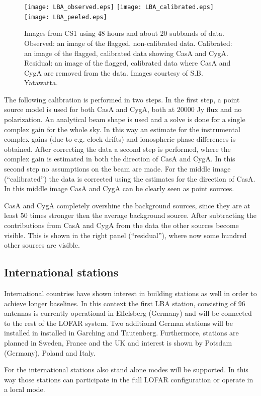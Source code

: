 \documentclass[journal]{IEEEtran}
\begin{document}
\begin{figure}
\centering
\texttt{[image: LBA\_observed.eps]}
\texttt{[image: LBA\_calibrated.eps]}
\texttt{[image: LBA\_peeled.eps]}
\caption{Images from CS1 using 48 hours and about 20 subbands of data. Observed: an image of the flagged, non-calibrated data. Calibrated: an image of the flagged, calibrated data showing CasA and CygA. Residual: an image of the flagged, calibrated data where CasA and CygA are removed from the data. Images courtesy of S.B. Yatawatta.}
\label{fig:skymap}
\end{figure}

The following calibration is performed in two steps. In the first step, a point source model is used for both CasA and CygA, both at 20000 Jy flux and no polarization. An analytical beam shape is used and a solve is done for a single complex gain for the whole sky. In this way an estimate for the instrumental complex gains (due to e.g. clock drifts) and ionospheric phase differences is obtained. After correcting the data a second step is performed, where the complex gain is estimated in both the direction of CasA and CygA. In this second step no assumptions on the beam are made. For the middle image (``calibrated'') the data is corrected using the estimates for the direction of CasA. In this middle image CasA and CygA can be clearly seen as point sources. 

CasA and CygA completely overshine the background sources, since they are at least 50 times stronger then the average background source. After subtracting the contributions from CasA and CygA from the data the other sources become visible. This is shown in the right panel (``residual''), where now some hundred other sources are visible. 

\subsection{International stations}
International countries have shown interest in building stations as well in order to achieve longer baselines. In this context the first LBA station, consisting of 96 antennas is currently operational in Effelsberg (Germany) and will be connected to the rest of the LOFAR system. Two additional German stations will be installed in installed in Garching and Tautenberg. Furthermore, stations are planned in Sweden, France and the UK and interest is shown by Potsdam (Germany), Poland and Italy.

For the international stations also stand alone modes will be supported. In this way those stations can participate in the full LOFAR configuration or operate in a local mode.
\end{document}
